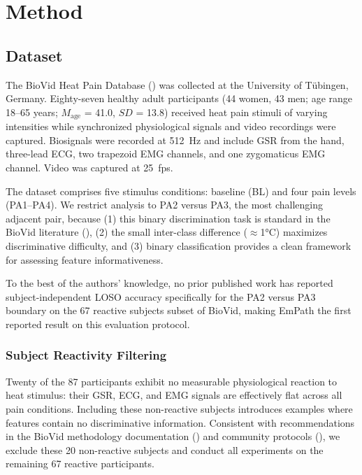 \documentclass[10pt, twocolumn]{article}
\begin{document}
\section{Method}
\label{sec:method}

\subsection{Dataset}

The BioVid Heat Pain Database (\cite{Walter2013}) was collected at the University of
Tübingen, Germany. Eighty-seven healthy adult participants (44 women, 43 men; age range
18--65 years; $M_{\text{age}}$ = 41.0, $SD$ = 13.8) received heat pain stimuli of varying
intensities while synchronized physiological signals and video recordings were captured.
Biosignals were recorded at 512~Hz and include GSR from the hand, three-lead ECG, two
trapezoid EMG channels, and one zygomaticus EMG channel. Video was captured at 25~fps.

The dataset comprises five stimulus conditions: baseline (BL) and four pain levels
(PA1--PA4). We restrict analysis to PA2 versus PA3, the most challenging adjacent
pair, because (1) this binary discrimination task is standard in the BioVid literature
(\cite{Kachele2015}), (2) the small inter-class difference ($\approx$1°C) maximizes
discriminative difficulty, and (3) binary classification provides a clean framework for
assessing feature informativeness.

To the best of the authors' knowledge, no prior published work has reported
subject-independent LOSO accuracy specifically for the PA2 versus PA3 boundary on the 67
reactive subjects subset of BioVid, making EmPath the first reported result on this
evaluation protocol.

\subsubsection{Subject Reactivity Filtering}

Twenty of the 87 participants exhibit no measurable physiological reaction to heat
stimulus: their GSR, ECG, and EMG signals are effectively flat across all pain conditions.
Including these non-reactive subjects introduces examples where features contain no
discriminative information. Consistent with recommendations in the BioVid methodology
documentation (\cite{Walter2013}) and community protocols (\cite{Gruss2015}), we exclude
these 20 non-reactive subjects and conduct all experiments on the remaining 67 reactive
participants.
\end{document}
